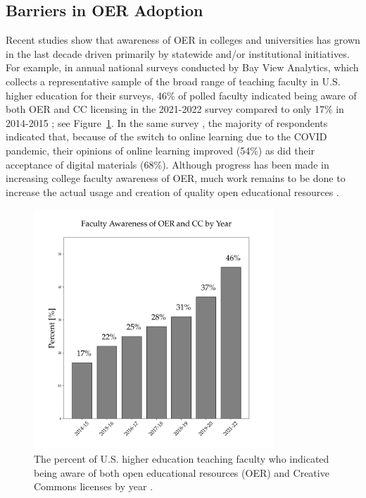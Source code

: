 \documentclass[11pt]{article}
\begin{document}
\subsection{Barriers in OER Adoption}
Recent studies show that awareness of OER in colleges and universities has grown in the last decade driven primarily by statewide and/or institutional initiatives.  For example, in annual national surveys conducted by Bay View Analytics, which collects a representative sample of the broad range of teaching faculty in U.S. higher education for their surveys, 46\% of polled faculty indicated being aware of both OER and CC licensing in the 2021-2022 survey compared to only 17\% in 2014-2015 \cite{JS-JS:2022}; see Figure~\ref{fig:oer-awareness}.  In the same survey \cite{JS-JS:2022}, the majority of respondents indicated that, because of the switch to online learning due to the COVID pandemic, their opinions of online learning improved (54\%) as did their acceptance of digital materials (68\%).  Although progress has been made in increasing college faculty awareness of OER, much work remains to be done to increase the actual usage and creation of quality open educational resources \cite{flvc2022}.
\begin{figure}[t]
\centering
\includegraphics[width=90mm]{oer_awareness.png}
\caption{The percent of U.S. higher education teaching faculty who indicated being aware of both open educational resources (OER) and Creative Commons licenses by year \cite{JS-JS:2022}.}
\label{fig:oer-awareness}
\end{figure}
\end{document}
